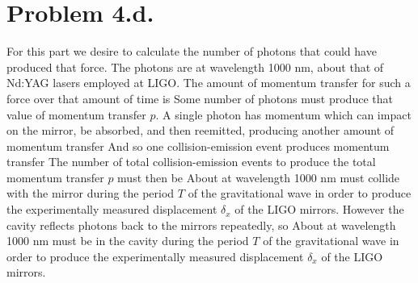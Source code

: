 \documentclass{article}
\begin{document}
\section*{Problem 4.d.}
For this part we desire to calculate the number of photons that could have produced that force. The photons are at wavelength 1000 nm, about that of Nd:YAG lasers employed at LIGO. The amount of momentum transfer for such a force over that amount of time is
Some number of photons must produce that value of momentum transfer $p$. A single photon has momentum 
which can impact on the mirror, be absorbed, and then reemitted, producing another amount of momentum transfer
And so one collision-emission event produces momentum transfer
The number of total collision-emission events to produce the total momentum transfer $p$ must then be
About  at wavelength 1000 nm must collide with the mirror during the period $T$ of the gravitational wave in order to produce the experimentally measured displacement $\delta_x$ of the LIGO mirrors. However the cavity reflects photons back to the mirrors repeatedly, so
About  at wavelength 1000 nm must be in the cavity during the period $T$ of the gravitational wave in order to produce the experimentally measured displacement $\delta_x$ of the LIGO mirrors.
\end{document}
